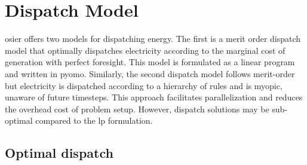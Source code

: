 \section{Dispatch Model}
\label{section:dispatch_model}
\ac{osier} offers two models for dispatching energy. The first is a merit order
dispatch model that optimally dispatches electricity according to the marginal
cost of generation with perfect foresight. This model is formulated as a
linear program and written in \ac{pyomo}. Similarly, the second dispatch model follows
merit-order but electricity is dispatched according to a hierarchy of rules and
is myopic, unaware of future timesteps. This approach facilitates parallelization 
and reduces the overhead cost of problem setup. However, dispatch solutions may be 
sub-optimal compared to the \ac{lp} formulation.

\subsection{Optimal dispatch}
\label{section:merit_order}


